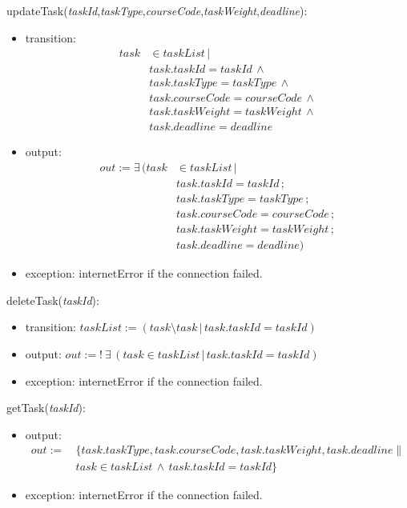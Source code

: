 \documentclass[12pt, titlepage]{article}
\begin{document}
\noindent updateTask(\textit{taskId},\textit{taskType},\textit{courseCode},\textit{taskWeight},\textit{deadline}):
\begin{itemize}
\item transition:
\begin{align*}
task &\in taskList \, | \\
&task.taskId = taskId \, \land \\
&task.taskType = taskType \, \land \\
&task.courseCode = courseCode \, \land \\
&task.taskWeight = taskWeight \, \land \\
&task.deadline = deadline
\end{align*}
\item output: 
\begin{align*}
out := \exists \, (task &\in taskList \, | \\
&task.taskId = taskId \, ; \\
&task.taskType = taskType \, ; \\
&task.courseCode = courseCode \, ; \\
&task.taskWeight = taskWeight \, ; \\
&task.deadline = deadline)
\end{align*}

\item exception: internetError if the connection failed.
\end{itemize}

\noindent deleteTask(\textit{taskId}):
\begin{itemize}
\item transition: \(taskList := (task \setminus task \, | \, task.taskId = taskId )\)
\item output: $out := \mathit{! \ \exists \, (task \in taskList \, | \, task.taskId = taskId)
}$
\item exception: internetError if the connection failed.
\end{itemize}

\noindent getTask(\textit{taskId}):
\begin{itemize}
\item output: 
\begin{align*}
out := &\, \{task.taskType, task.courseCode, task.taskWeight, task.deadline\| \\
&\, task \in taskList \, \land \, task.taskId = taskId\}
\end{align*}

\item exception: internetError if the connection failed.
\end{itemize}
\end{document}

